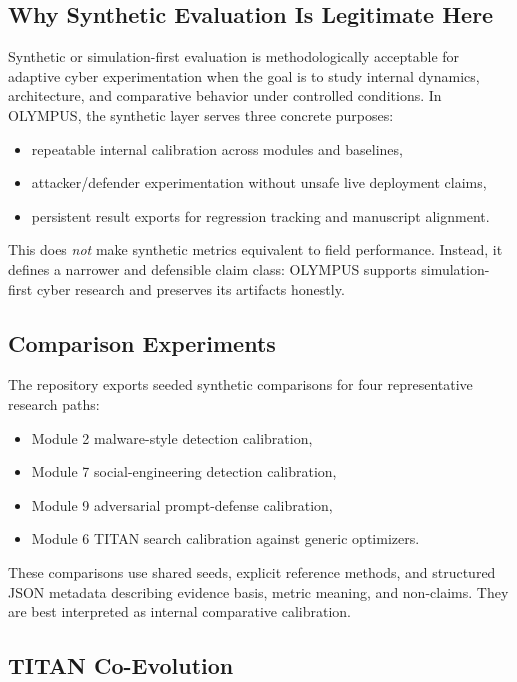 \documentclass[conference]{IEEEtran}
\begin{document}
\subsection{Why Synthetic Evaluation Is Legitimate Here}

Synthetic or simulation-first evaluation is methodologically acceptable for
adaptive cyber experimentation when the goal is to study internal dynamics,
architecture, and comparative behavior under controlled conditions. In OLYMPUS,
the synthetic layer serves three concrete purposes:
\begin{itemize}
  \item repeatable internal calibration across modules and baselines,
  \item attacker/defender experimentation without unsafe live deployment claims,
  \item persistent result exports for regression tracking and manuscript alignment.
\end{itemize}

This does \emph{not} make synthetic metrics equivalent to field performance.
Instead, it defines a narrower and defensible claim class: OLYMPUS supports
simulation-first cyber research and preserves its artifacts honestly.

\subsection{Comparison Experiments}

The repository exports seeded synthetic comparisons for four representative
research paths:
\begin{itemize}
  \item Module 2 malware-style detection calibration,
  \item Module 7 social-engineering detection calibration,
  \item Module 9 adversarial prompt-defense calibration,
  \item Module 6 TITAN search calibration against generic optimizers.
\end{itemize}

These comparisons use shared seeds, explicit reference methods, and structured
JSON metadata describing evidence basis, metric meaning, and non-claims. They are
best interpreted as internal comparative calibration.

\subsection{TITAN Co-Evolution}
\end{document}
